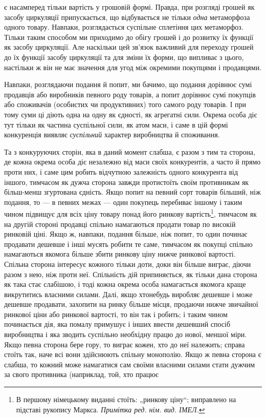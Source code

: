 \parcont{}  %
є насамперед тільки вартість у грошовій формі. Правда, при
розгляді грошей як засобу циркуляції припускається, що відбувається
не тільки \emph{одна} метаморфоза одного товару. Навпаки,
розглядається суспільне сплетіння цих метаморфоз. Тільки
таким способом ми приходимо до обігу грошей і до розвитку їх
функції як засобу циркуляції. Але наскільки цей зв’язок важливий
для переходу грошей до їх функції засобу циркуляції та
для зміни їх форми, що випливає з цього, настільки ж він не
має значення для угод між окремими покупцями і продавцями.

Навпаки, розглядаючи подання й попит, ми бачимо, що подання
дорівнює сумі продавців або виробників певного роду
товарів, а попит дорівнює сумі покупців або споживачів (особистих
чи продуктивних) того самого роду товарів. І при тому
суми ці діють одна на одну як єдності, як агрегатні сили. Окрема
особа діє тут тільки як частина суспільної сили, як атом маси,
і саме в цій формі конкуренція виявляє \emph{суспільний} характер
виробництва й споживання.

Та з конкуруючих сторін, яка в даний момент слабша, є разом
з тим та сторона, де кожна окрема особа діє незалежно від маси
своїх конкурентів, а часто й прямо проти них, і саме цим робить
відчутною залежність одного конкурента від іншого, тимчасом
як дужча сторона завжди протистоїть своїм противникам як
більш-менш згуртована єдність. Якщо попит на певний сорт
товарів більший, ніж подання, то — в певних межах — один покупець
перебиває іншому і таким чином підвищує для всіх ціну
товару понад його ринкову вартість\footnote*{
В першому німецькому виданні стоїть: „ринкову ціну“; виправлено на
підставі рукопису Маркса. \emph{Примітка ред. нім. вид. ІМЕЛ.}
}, тимчасом як на другій
стороні продавці спільно намагаються продати товар по високій
ринковій ціні. Якщо ж, навпаки, подання більше, ніж попит,
то один починає продавати дешевше і інші мусять робити те саме,
тимчасом як покупці спільно намагаються якомога більше збити
ринкову ціну нижче ринкової вартості. Спільна сторона інтересує
кожного тільки доти, доки він більше виграє, діючи разом з нею,
ніж проти неї. Спільність дій припиняється, як тільки дана сторона
як така стає слабішою, і тоді кожна окрема особа намагається
якомога краще викрутитись власними силами. Далі,
якщо хтонебудь виробляє дешевше і може дешевше продавати,
захопити на ринку більше місця, продаючи нижче звичайної
ринкової ціни або ринкової вартості, то він так і робить; і таким
чином починається дія, яка помалу примушує і інших ввести
дешевший спосіб виробництва і яка зводить суспільно необхідну
працю до нової, меншої міри. Якщо певна сторона бере гору,
то виграє кожен, хто до неї належить; справа стоїть так, наче
всі вони здійснюють спільну монополію. Якщо ж певна сторона
є слабша, то кожний може намагатися сам своїми власними силами
стати дужчим за свого противника (наприклад, той, хто працює
\parbreak{}  %
